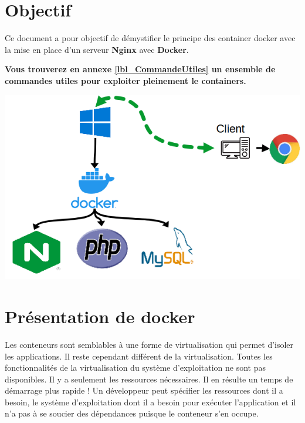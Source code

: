 \documentclass[french, 12pt]{article}%
\newcommand{\titreencadre}{Titre}
\newenvironment{encadre}[1]{\renewcommand{\titreencadre}{#1}
	\begin{mdframed}[style=encadrestyle]
	\vspace{0.5\baselineskip}
	}{%
	\end{mdframed}}
\begin{document}
\vspace{0.25cm}


\section{Objectif }

Ce document a pour objectif de démystifier le principe des container docker avec la mise en place d'un serveur \textbf{Nginx} avec \textbf{Docker}. 

\begin{encadre}{Commandes utiles}
\textbf{Vous trouverez en annexe \ref{lbl_CommandeUtiles} un ensemble de commandes utiles pour exploiter pleinement le containers.}
\end{encadre}
\begin{center}
\includegraphics[scale=0.6]{./ressource/schema_docker}
\end{center}



\section{Présentation de docker}

Les conteneurs sont semblables à une forme de virtualisation qui permet d'isoler les applications. Il reste cependant différent de la virtualisation.
Toutes les fonctionnalités de la virtualisation du système d'exploitation ne sont pas disponibles. Il y a seulement les ressources nécessaires. Il en résulte un temps de démarrage plus rapide ! 
Un développeur peut spécifier les ressources dont il a besoin, le système d'exploitation dont il a besoin pour exécuter l'application et il n'a pas à se soucier des dépendances puisque le conteneur s'en occupe.
\end{document}
